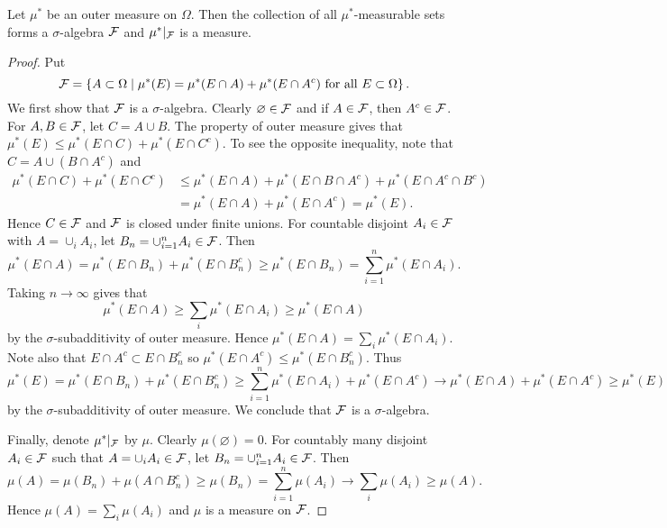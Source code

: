 \begin{lemma}\label{lem:caratheodory}
    Let $\mu^*$ be an outer measure on $\Omega$. Then the collection of all
    $\mu^*$-measurable sets forms a $\sigma$-algebra $\mathcal{F}$ and $\mu^*|_{\mathcal{F}}$ is 
    a measure.
\end{lemma}
\begin{proof}
    Put 
    \begin{equation*}
        \mathcal{F} = \left\{ A\subset\Omega \;\middle\vert\; \mu^*(E) = \mu^*(E\cap A) + \mu^*(E\cap A^c) \text{ for all } E\subset\Omega \right\}.
    \end{equation*}
    We first show that $\mathcal{F}$ is a $\sigma$-algebra. Clearly $\varnothing\in\mathcal{F}$ and
    if $A\in\mathcal{F}$, then $A^c\in\mathcal{F}$. For $A, B\in\mathcal{F}$, let $C = A\cup B$. The property of
    outer measure gives that $\mu^*(E)\leq \mu^*(E\cap C) + \mu^*(E\cap C^c)$.
    To see the opposite inequality, note that $C = A\cup (B\cap A^c)$ and
    \begin{equation*}
        \begin{split}
            \mu^*(E\cap C) + \mu^*(E\cap C^c) 
            &\leq \mu^*(E\cap A) + \mu^*(E\cap B\cap A^c) + \mu^*(E\cap A^c\cap B^c) \\
            &= \mu^*(E\cap A) + \mu^*(E\cap A^c) = \mu^*(E).
        \end{split}
    \end{equation*}
    Hence $C\in\mathcal{F}$ and $\mathcal{F}$ is closed under finite unions. For countable disjoint 
    $A_i\in\mathcal{F}$ with $A = \cup_i A_i$, let $B_n = \cup_{i=1}^n A_i\in\mathcal{F}$. Then 
    \begin{equation*}
        \mu^*(E\cap A) = \mu^*(E\cap B_n) + \mu^*(E\cap B_n^c)
        \geq \mu^*(E\cap B_n) = \sum_{i=1}^n \mu^*(E\cap A_i).
    \end{equation*} 
    Taking $n\to\infty$ gives that 
    \begin{equation*}
        \mu^*(E\cap A) \geq \sum_i \mu^*(E\cap A_i) 
        \geq \mu^*(E\cap A)
    \end{equation*}
    by the $\sigma$-subadditivity of outer measure. Hence 
    $\mu^*(E\cap A) = \sum_i \mu^*(E\cap A_i)$. Note also 
    that $E\cap A^c\subset E\cap B_n^c$ so 
    $\mu^*(E\cap A^c)\leq \mu^*(E\cap B_n^c)$. 
    Thus 
    \begin{equation*}
        \mu^*(E) = \mu^*(E\cap B_n) + \mu^*(E\cap B_n^c) 
        \geq \sum_{i=1}^n \mu^*(E\cap A_i) + \mu^*(E\cap A^c) 
        \to \mu^*(E\cap A) + \mu^*(E\cap A^c)
        \geq \mu^*(E)
    \end{equation*}
    by the $\sigma$-subadditivity of outer measure. We conclude that 
    $\mathcal{F}$ is a $\sigma$-algebra. 

    Finally, denote $\mu^*|_{\mathcal{F}}$ by $\mu$. Clearly $\mu(\varnothing) = 0$. 
    For countably many disjoint $A_i\in\mathcal{F}$ such that $A = \cup_i A_i\in\mathcal{F}$, 
    let $B_n = \cup_{i=1}^n A_i\in\mathcal{F}$. Then 
    \begin{equation*}
        \mu(A) = \mu(B_n) + \mu(A\cap B_n^c) 
        \geq \mu(B_n) = \sum_{i=1}^n \mu(A_i) 
        \to \sum_i \mu(A_i) \geq \mu(A).
    \end{equation*}
    Hence $\mu(A) = \sum_i \mu(A_i)$ and $\mu$ is a measure on $\mathcal{F}$. 
\end{proof}

